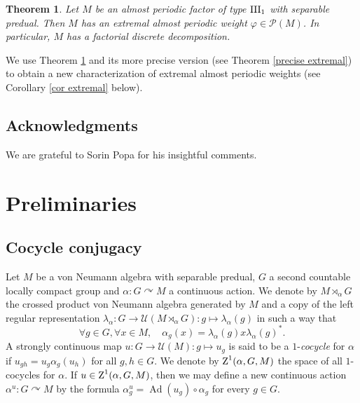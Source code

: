 \documentclass[a4paper,11pt]{amsart}
\numberwithin{equation}{section}
\newtheorem{letterthm}{Theorem}
\theoremstyle{definition}
\newcommand{\Ad}{\operatorname{Ad}}
\newcommand{\rZ}{\mathord{\text{\rm Z}}}
\newcommand{\III}{{\rm III}}
\begin{document}
 


\begin{letterthm} \label{main extremal}
Let $M$ be an almost periodic factor of type $\III_1$ with separable predual. Then $M$ has an extremal almost periodic weight $\varphi \in \mathcal P(M)$. In particular, $M$ has a factorial discrete decomposition.
\end{letterthm}
 
We use Theorem \ref{main extremal} and its more precise version (see Theorem \ref{precise extremal}) to obtain a new  characterization of extremal almost periodic weights (see Corollary \ref{cor extremal} below).


\subsection*{Acknowledgments} We are grateful to Sorin Popa for his insightful comments.





\section{Preliminaries}\label{preliminaries}



\subsection{Cocycle conjugacy}

Let $M$ be a von Neumann algebra with separable predual, $G$ a second countable locally compact group and $\alpha : G \curvearrowright M$ a continuous action. We denote by $M \rtimes_\alpha G$ the crossed product von Neumann algebra generated by $M$ and a copy of the left regular representation $\lambda_\alpha : G \to \mathcal U(M \rtimes_\alpha G) : g \mapsto \lambda_\alpha(g)$ in such a way that 
$$\forall g \in G, \forall x \in M, \quad \alpha_g(x) = \lambda_\alpha(g) x \lambda_\alpha(g)^*.$$
A strongly continuous map $u : G \to \mathcal U(M) : g \mapsto u_g$ is said to be a $1$-{\em cocycle} for $\alpha$ if $u_{gh} = u_g \alpha_g(u_h)$ for all $g, h \in G$. We denote by $\rZ^1(\alpha, G, M)$ the space of all $1$-cocycles for $\alpha$. If $u \in \rZ^1(\alpha, G, M)$, then we may define a new continuous action $\alpha^u : G \curvearrowright M$ by the formula $\alpha_g^u = \Ad(u_g) \circ \alpha_g$ for every $g \in G$.
\end{document}
